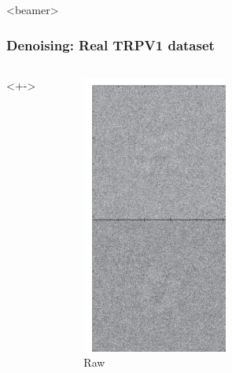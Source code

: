 \documentclass{beamer}
\begin{document}
\begin{frame}<beamer>
\frametitle{Denoising: Real TRPV1 dataset}
\begin{columns}<+->

\begin{figure}
\centering
\includegraphics[width=.9 \columnwidth]{figures/deneg_raw.png}
\caption{Raw}
\end{figure}


\end{columns}
\end{frame}
\end{document}
